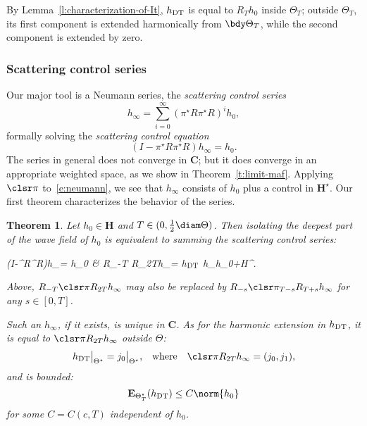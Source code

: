 \documentclass[10pt]{article}
\theoremstyle{plain}
\newtheorem{theorem}{Theorem}
\theoremstyle{definition}
\theoremstyle{remark}
\numberwithin{theorem}{section}
\numberwithin{example}{section}
\numberwithin{equation}{section}
\numberwithin{figure}{section}
\newcommand\En{\mathbf E}		%
\newcommand\DT{\ensuremath{_{\text{\normalfont DT}}}}		%
\begin{document}
By Lemma~\ref{l:characterization-of-It}, $h\DT$ is equal to $R_Th_0$ inside $\Theta_T$; outside $\Theta_T$, its first component is extended harmonically from $\bdy\Theta_T$, while the second component is extended by zero.

\subsubsection{Scattering control series}

Our major tool is a Neumann series, the \emph{scattering control series}
\begin{equation}
	h_\infty = \sum_{i=0}^\infty (\pi^\star R\pi^\star R)^i h_0,
	\label{e:neumann}
\end{equation}
formally solving the \emph{scattering control equation}
\begin{equation}
	(I-\pi^\star R\pi^\star R)h_\infty = h_0.
	\label{e:maf}
\end{equation}
The series in general does not converge in $\mathbf C$; but it does converge in an appropriate weighted space, as we show in Theorem~\ref{t:limit-maf}. Applying $\clsr\pi$ to~\eqref{e:neumann}, we see that $h_\infty$ consists of $h_0$ plus a control in $\mathbf H^\star$. Our first theorem characterizes the behavior of the series. 

\begin{theorem}
	Let $h_0\in\mathbf H$ and $T\in(0,\frac12\diam\Theta)$. Then isolating the deepest part of the wave field of $h_0$ is equivalent to summing the scattering control series:
	\begin{nalign}
			(I-\pi^\star R\pi^\star R)h_\infty = h_0
		&\iff
			R_{-T} \clsr\pi R_{2T}h_\infty = h\DT
			h_\infty \in h_0+\mathbf H^\star.
		\label{e:basic-maf-behavior}
	\end{nalign}
	Above, $R_{-T} \clsr\pi R_{2T}h_\infty$ may also be replaced by $R_{-s} \clsr\pi_{T-s} R_{T+s}h_\infty$ for any $s\in[0,T]$.
	
	Such an $h_\infty$, if it exists, is unique in $\mathbf C$. As for the harmonic extension in $h\DT$, it is equal to $\clsr\pi R_{2T}h_\infty$ outside $\Theta$:
	\begin{align}
		h\DT\big|_{\Theta^\star} &= j_0\big|_{\Theta^\star},
		&
		\text{where\quad}\clsr\pi R_{2T}h_\infty = (j_0,j_1),
		\label{e:harmonic-ext-identity}
	\end{align}
	and is bounded:
	\begin{equation}
		\En_{\Theta_T^\star}(h\DT) \leq C\norm{h_0}
		\label{e:harmonic-ext-bound}
	\end{equation}
	for some $C=C(c,T)$ independent of $h_0$.
	\label{t:basic-maf}
\end{theorem}
\end{document}
